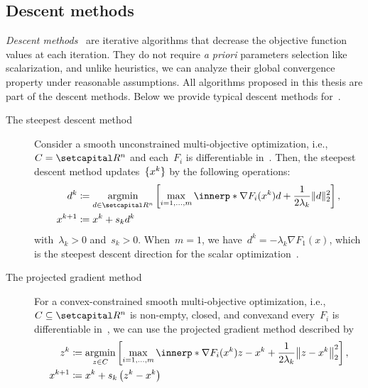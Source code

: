 \documentclass[../../main]{subfiles}
\begin{document}
\subsection{Descent methods} 
\emph{Descent methods}~\cite{Fukuda2014} are iterative algorithms that decrease the objective function values at each iteration.
They do not require \emph{a priori} parameters selection like scalarization, and unlike heuristics, we can analyze their global convergence property under reasonable assumptions.
All algorithms proposed in this thesis are part of the descent methods.
Below we provide typical descent methods for~.

\begin{example} 
    \begin{description}
        \item[The steepest descent method~\cite{Fliege2000}] Consider a smooth unconstrained multi-objective optimization, i.e.,~$C = \setR^n$ and each~$F_i$ is differentiable in~.
            Then, the steepest descent method updates~$\lbrace x^k\rbrace$ by the following operations:
            \begin{align} \label{eq:steepest_descent}
                d^k &\coloneqq \argmin_{d \in \setR^n} \left[ \max_{i = 1, \dots, m} \innerp*{\nabla F_i(x^k)}{d} + \frac{1}{2 \lambda_k} \norm{d}_2^2 \right], \\
                x^{k + 1} &\coloneqq x^k + s_k d^k
            \end{align}
            with~$\lambda_k > 0$ and~$s_k > 0$.
            When~$m = 1$, we have~$d^k = - \lambda_k \nabla F_1(x)$, which is the steepest descent direction for the scalar optimization~\cite{Cauchy1847}.
        \item[The projected gradient method~\cite{Grana-Drummond2004,Fukuda2013}] For a convex-constrained smooth multi-objective optimization, i.e.,~$C \subseteq \setR^n$ is non-empty, closed, and convexand every~$F_i$ is differentiable in~, we can use the projected gradient method described by
            \begin{equation} \label{eq:proj_grad}
                \begin{aligned} 
                    z^k &\coloneqq \argmin_{z \in C} \left[ \max_{i = 1, \dots, m} \innerp*{\nabla F_i(x^k)}{z - x^k} + \frac{1}{2 \lambda_k} \norm*{z - x^k}_2^2 \right], \\
                    x^{k + 1} &\coloneqq x^k + s_k \left(z^k - x^k \right)

\end{aligned}
\end{equation}
\end{description}
\end{example}
\end{document}
